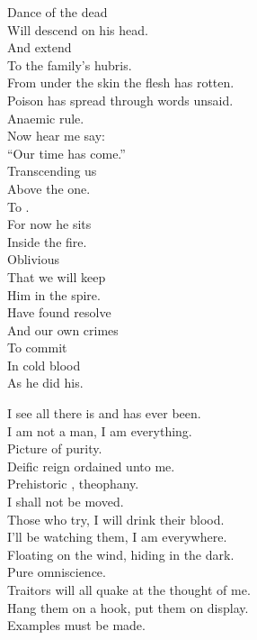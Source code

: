 Dance of the dead \\
Will descend on his head. \\
And extend \\
To the family's hubris. \\

From under the skin the flesh has rotten. \\
Poison has spread through words unsaid. \\
Anaemic rule. \\

Now hear me say: \\
``Our time has come.'' \\
Transcending us \\
Above the one. \\
To . \\

For now he sits \\
Inside the fire. \\
Oblivious \\
That we will keep \\
Him in the spire. \\

Have found resolve \\
And our own crimes \\
To commit \\
In cold blood \\
As he did his. \\





I see all there is and has ever been. \\
I am not a man, I am everything. \\
Picture of purity. \\

Deific reign ordained unto me. \\
Prehistoric , theophany. \\
I shall not be moved. \\
Those who try, I will drink their blood. \\

I'll be watching them, I am everywhere. \\
Floating on the wind, hiding in the dark. \\
Pure omniscience. \\
Traitors will all quake at the thought of me. \\
Hang them on a hook, put them on display. \\
Examples must be made. \\

